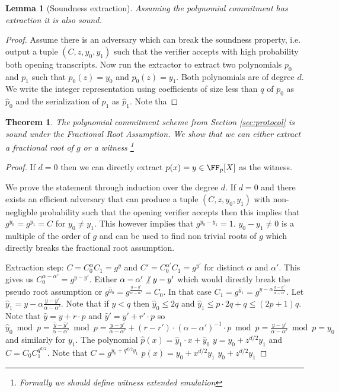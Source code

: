 \documentclass{article}
\newtheorem{theorem}{Theorem}
\newtheorem{lemma}{Lemma}
\begin{document}
\begin{lemma}[Soundness extraction]
	Assuming the polynomial commitment has extraction it is also sound.
\end{lemma}
\begin{proof}
	Assume there is an adversary which can break the soundness property, i.e. output a tuple $(C,z,y_0,y_1)$ such that the verifier accepts with high probability both opening transcripts. Now run the extractor to extract two polynomials $p_0$ and $p_1$ such that $p_0(z)=y_0$ and $p_0(z)=y_1$. Both polynomials are of degree $d$. We write the integer representation using coefficients of size less than $q$ of $p_0$ as $\hat{p}_0$ and the serialization of $p_1$ as $\hat{p}_1$. Note tha
\end{proof}
\begin{theorem}
	The polynomial commitment scheme from Section \ref{sec:protocol} is sound under the Fractional Root Assumption. We show that we can either extract a fractional root of $g$ or a witness \footnote{Formally we should define witness extended emulation }
\end{theorem}
\begin{proof}

If $d=0$ then we can directly extract $p(x)=y\in \FF_p[X]$ as the witness. 


	We prove the statement through induction over the degree $d$. If $d=0$ and there exists an efficient adversary that can produce a tuple $(C,z,y_0,y_1)$ with non-negligble probability such that the opening verifier accepts then this implies that $g^{y_0}=g^{y_1}=C$ for $y_0\neq y_1$. This however implies that $g^{y_0-y_1}=1$. $y_0-y_1\neq 0$ is a multiple of the order of $g$ and can be used to find non trivial roots of $g$ which directly breaks the fractional root assumption.



Extraction step: $C=C_0^{\alpha}C_1=g^{y}$ and $C'=C_0^{\alpha'}C_1=g^{y'}$ for distinct $\alpha$ and $\alpha'$. This gives us $C_0^{\alpha-\alpha'}=g^{y-y'}$. Either $\alpha-\alpha'\not\vert~y-y' $ which would directly break the pseudo root assumption or $g^{\hat{y}_0}=g^{\frac{y-y'}{\alpha-\alpha'}}=C_0$. In that case $C_1=g^{\hat{y}_1}=g^{y-\alpha\frac{y-y'}{\alpha-\alpha'}}$. Let $\hat{y}_1=y-\alpha\frac{y-y'}{\alpha-\alpha'}$. Note that if $y<q$ then $\hat{y}_0\leq 2q$ and $\hat{y}_1\leq p \cdot 2q +q\leq (2p+1)q$. Note that $\hat{y}=y+r\cdot p$ and $\hat{y}'=y'+r'\cdot p$ so $\hat{y}_0 \bmod p=\frac{\hat{y}-\hat{y}'}{\alpha-\alpha'}\bmod p=\frac{y-y'}{\alpha-\alpha'}+(r-r')\cdot ({\alpha-\alpha'})^{-1}\cdot p\bmod p=\frac{y-y'}{\alpha-\alpha'}\bmod p=y_0$ and similarly for $y_1$.
The polynomial $\hat{p}(x)=\hat{y}_1\cdot x+ \hat{y}_0$
$y=y_0+z^{d/2} y_1$ and $C=C_0C_1^{q^{d/2}}$. Note that $C=g^{y_0+q^{d/2}y_1}$ 
$p(x)=y_0+x^{d/2}y_1$
$y_0+z^{d/2} y_1$


\end{proof}
  
\end{document}

